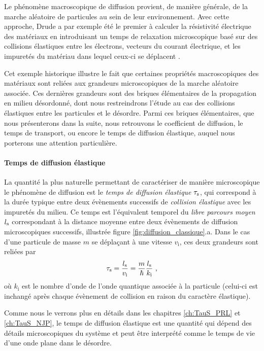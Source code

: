 Le phénomène macroscopique de diffusion provient, de manière générale, de la marche aléatoire de particules au sein de leur environnement. Avec cette approche, Drude a par exemple été le premier à calculer la résistivité électrique des matériaux en introduisant un temps de relaxation microscopique basé sur des collisions élastiques entre les électrons, vecteurs du courant électrique, et les impuretés du matériau dans lequel ceux-ci se déplacent \citep{ashcroft2010solid}. 

Cet exemple historique illustre le fait que certaines propriétés macroscopiques des matériaux sont reliées aux grandeurs microscopiques de la marche aléatoire associée. Ces dernières grandeurs sont des briques élémentaires de la propagation en milieu désordonné, dont nous restreindrons l'étude au cas des collisions élastiques entre les particules et le désordre. Parmi ces briques élémentaires, que nous présenterons dans la suite, nous retrouvons le coefficient de diffusion, le temps de transport, ou encore le temps de diffusion élastique, auquel nous porterons une attention particulière.

\paragraph*{Temps de diffusion élastique}
La quantité la plus naturelle permettant de caractériser de manière microscopique le phénomène de diffusion est le \emph{temps de diffusion élastique} $\tau_{\mathrm{s}}$, qui correspond à la durée typique entre deux évènements successifs de \emph{collision élastique} avec les impuretés du milieu. Ce temps est l'équivalent temporel du \emph{libre parcours moyen}  $l_{\mathrm{s}}$ correspondant à la distance moyenne entre deux évènements de diffusion microscopiques successifs, illustrée figure \ref{fig:diffusion_classique}.a. Dans le cas d'une particule de masse $m$ se déplaçant à une vitesse $v_{\mathrm{i}}$, ces deux grandeurs sont reliées par
\begin{equation}
\tau_{\mathrm{s}}=\frac{l_{\mathrm{s}}}{v_{\mathrm{i}}}=\frac{m}{\hslash} \frac{l_{\mathrm{s}}}{k_{\mathrm{i}}} \text{ ,}
\label{eq:definition_taus}
\end{equation}
où $k_{\mathrm{i}}$ est le nombre d'onde de l'onde quantique associée à la particule (celui-ci est inchangé après chaque évènement de collision en raison du caractère élastique). 

Comme nous le verrons plus en détails dans les chapitres \ref{ch:TauS_PRL} et \ref{ch:TauS_NJP}, le temps de diffusion élastique est une quantité qui dépend des détails microscopiques du système et peut être interprété comme le temps de vie d'une onde plane dans le désordre.

